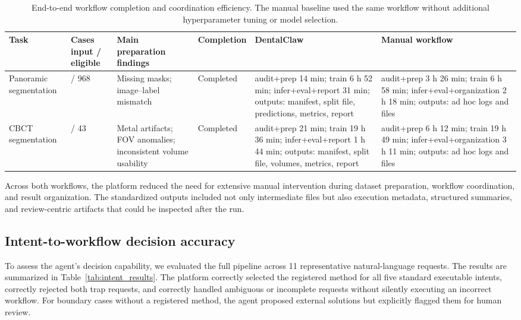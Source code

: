 \documentclass[final,5p,times,twocolumn]{elsarticle}
\begin{document}
\begin{table}[!t]
\centering
\small
\setlength{\tabcolsep}{4pt}
\renewcommand{\arraystretch}{1.12}
\caption{End-to-end workflow completion and coordination efficiency. The manual baseline used the same workflow without additional hyperparameter tuning or model selection.}
\label{tab:workflow_validation}
\begin{threeparttable}
\begin{tabularx}{\textwidth}{>{\raggedright\arraybackslash}p{2.3cm}>{\centering\arraybackslash}p{1.6cm}>{\raggedright\arraybackslash}p{3.0cm}>{\centering\arraybackslash}p{1.4cm}>{\raggedright\arraybackslash}X>{\raggedright\arraybackslash}X}
\toprule
Task & Cases input / eligible & Main preparation findings & Completion & DentalClaw & Manual workflow \\
\midrule
Panoramic segmentation & 1051 / 968 & Missing masks; image--label mismatch & Completed & audit+prep 14 min; train 6 h 52 min; infer+eval+report 31 min; outputs: manifest, split file, predictions, metrics, report & audit+prep 3 h 26 min; train 6 h 58 min; infer+eval+organization 2 h 18 min; outputs: ad hoc logs and files \\
\addlinespace
CBCT segmentation & 63 / 43 & Metal artifacts; FOV anomalies; inconsistent volume usability & Completed & audit+prep 21 min; train 19 h 36 min; infer+eval+report 1 h 44 min; outputs: manifest, split file, volumes, metrics, report & audit+prep 6 h 12 min; train 19 h 49 min; infer+eval+organization 3 h 11 min; outputs: ad hoc logs and files \\
\bottomrule
\end{tabularx}
\end{threeparttable}
\end{table}

Across both workflows, the platform reduced the need for extensive manual intervention during dataset preparation, workflow coordination, and result organization. The standardized outputs included not only intermediate files but also execution metadata, structured summaries, and review-centric artifacts that could be inspected after the run.

\subsection{Intent-to-workflow decision accuracy}
To assess the agent's decision capability, we evaluated the full pipeline across 11 representative natural-language requests. The results are summarized in Table~\ref{tab:intent_results}. The platform correctly selected the registered method for all five standard executable intents, correctly rejected both trap requests, and correctly handled ambiguous or incomplete requests without silently executing an incorrect workflow. For boundary cases without a registered method, the agent proposed external solutions but explicitly flagged them for human review.
\end{document}
